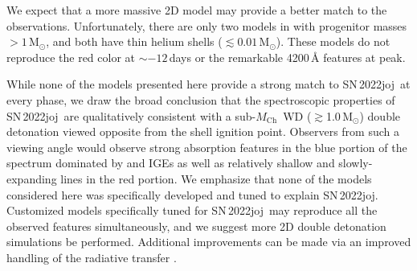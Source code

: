 \documentclass[twocolumn]{aastex631}
\newcommand{\sn}{SN\,2022joj}
\newcommand{\Mch}{$M_\mathrm{Ch}$}
\begin{document}
\begin{CJK*}{UTF8}{gbsn}
We expect that a more massive 2D model may provide a better match to the observations. Unfortunately, there are only two models in \citet{Shen_2D_2021} with progenitor masses $>1\,\mathrm{M_\odot}$, and both have thin helium shells ($\lesssim$$0.01\,\mathrm{M_\odot}$). These models do not reproduce the red color at $\sim$$-12$\,days or the remarkable 4200\,\r{A} features at peak.

While none of the models presented here provide a strong match to \sn\ at every phase, we draw the broad conclusion that the spectroscopic properties of \sn\ are qualitatively consistent with a sub-\Mch\ WD ($\gtrsim$1.0\,$\mathrm{M_\odot}$) double detonation viewed opposite from the shell ignition point. Observers from such a viewing angle would observe strong absorption features in the blue portion of the spectrum dominated by  and IGEs as well as relatively shallow and slowly-expanding  lines in the red portion. We emphasize that none of the models considered here was specifically developed and tuned to explain \sn. Customized models specifically tuned for \sn\ may reproduce all the observed features simultaneously, and we suggest more 2D double detonation simulations be performed. Additional improvements can be made via an improved handling of the radiative transfer \citep[e.g., non-LTE effects; see][]{Shen_NLTE_2021}.


\end{CJK*}
\end{document}

